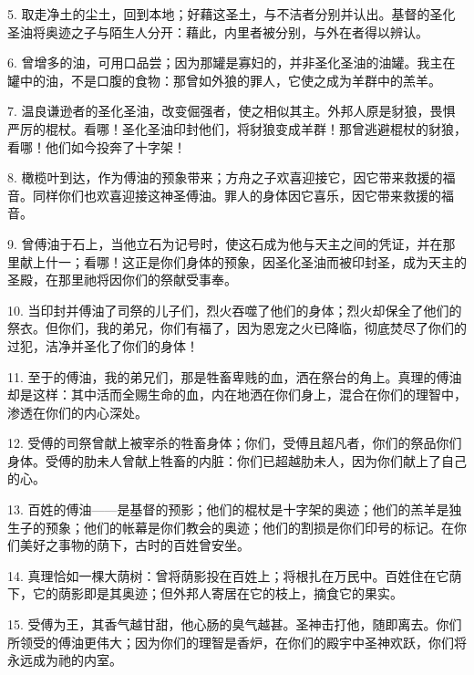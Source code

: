 5. 取走净土的尘土，回到本地；好藉这圣土，与不洁者分别并认出。基督的圣化圣油将奥迹之子与陌生人分开：藉此，内里者被分别，与外在者得以辨认。\par

6. 曾增多的油，可用口品尝；因为那罐是寡妇的，并非圣化圣油的油罐。我主在罐中的油，不是口腹的食物：那曾如外狼的罪人，它使之成为羊群中的羔羊。\par

7. 温良谦逊者的圣化圣油，改变倔强者，使之相似其主。外邦人原是豺狼，畏惧严厉的棍杖。看哪！圣化圣油印封他们，将豺狼变成羊群！那曾逃避棍杖的豺狼，看哪！他们如今投奔了十字架！\par

8. 橄榄叶到达，作为傅油的预象带来；方舟之子欢喜迎接它，因它带来救援的福音。同样你们也欢喜迎接这神圣傅油。罪人的身体因它喜乐，因它带来救援的福音。\par

9. 曾傅油于石上，当他立石为记号时，使这石成为他与天主之间的凭证，并在那里献上什一；看哪！这正是你们身体的预象，因圣化圣油而被印封圣，成为天主的圣殿，在那里祂将因你们的祭献受事奉。\par

10. 当印封并傅油了司祭的儿子们，烈火吞噬了他们的身体；烈火却保全了他们的祭衣。但你们，我的弟兄，你们有福了，因为恩宠之火已降临，彻底焚尽了你们的过犯，洁净并圣化了你们的身体！\par

11. 至于的傅油，我的弟兄们，那是牲畜卑贱的血，洒在祭台的角上。真理的傅油却是这样：其中活而全赐生命的血，内在地洒在你们身上，混合在你们的理智中，渗透在你们的内心深处。\par

12. 受傅的司祭曾献上被宰杀的牲畜身体；你们，受傅且超凡者，你们的祭品你们身体。受傅的肋未人曾献上牲畜的内脏：你们已超越肋未人，因为你们献上了自己的心。\par

13. 百姓的傅油——是基督的预影；他们的棍杖是十字架的奥迹；他们的羔羊是独生子的预象；他们的帐幕是你们教会的奥迹；他们的割损是你们印号的标记。在你们美好之事物的荫下，古时的百姓曾安坐。\par

14. 真理恰如一棵大荫树：曾将荫影投在百姓上；将根扎在万民中。百姓住在它荫下，它的荫影即是其奥迹；但外邦人寄居在它的枝上，摘食它的果实。\par

15. 受傅为王，其香气越甘甜，他心肠的臭气越甚。圣神击打他，随即离去。你们所领受的傅油更伟大；因为你们的理智是香炉，在你们的殿宇中圣神欢跃，你们将永远成为祂的内室。\par

